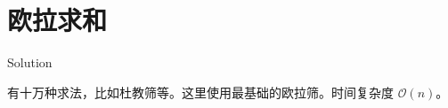 \section{欧拉求和}

\begin{frame}{Solution}

有十万种求法，比如杜教筛等。这里使用最基础的欧拉筛。时间复杂度 $\mathcal O(n)$。

\end{frame}